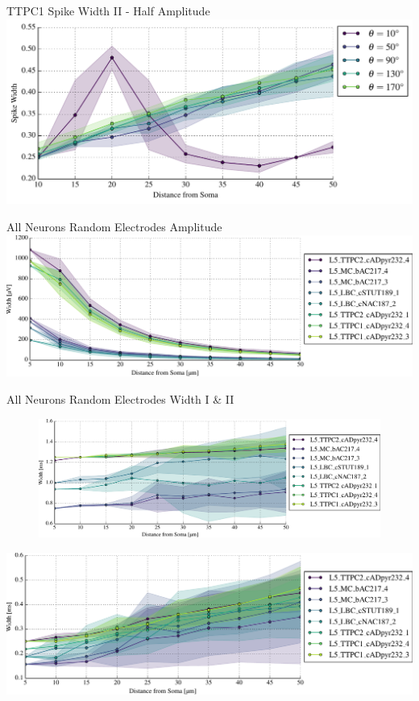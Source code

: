 \documentclass{beamer}
\begin{document}
\begin{frame}{TTPC1 Spike Width II - Half Amplitude}{}
    \centering
    \includegraphics[width=1.0\textwidth]{images/sym_spike_width_II.pdf}
\end{frame}

\begin{frame}{All Neurons Random Electrodes Amplitude}{}
    \centering
    \includegraphics[width=1.0\textwidth]{images/singles_amps_II_all.pdf}
\end{frame}

\begin{frame}{All Neurons Random Electrodes Width I \& II}{}
    \centering
    \begin{figure}
    \includegraphics[height=0.4\textheight]{images/singles_widths_I_all.pdf}\\
    \end{figure}
    \includegraphics[height=0.4\textheight]{images/singles_widths_II_all.pdf}
\end{frame}
\end{document}
